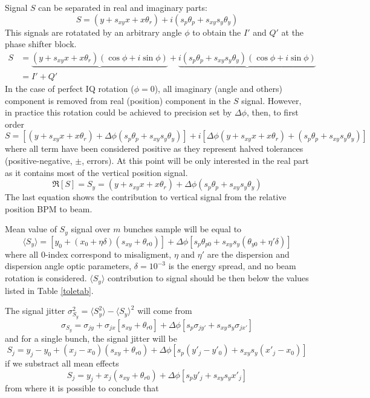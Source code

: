 Signal $S$ can be separated in real and imaginary parts:
\begin{equation}
S = (y+s_{xy}x+x\theta_r)+i(s_p\theta_p+s_{xy}s_y\theta_y)
\end{equation}
This signals are rotatated by an arbitrary angle $\phi$ to obtain the $I'$ and $Q'$ at the phase shifter block.
\begin{align*}
S &= \underbrace{(y+s_{xy}x+x\theta_r)(\cos\phi+i\sin\phi)}+\underbrace{i(s_p\theta_p+s_{xy}s_y\theta_y)(\cos\phi+i\sin\phi)}\\
  &= I' + Q' 
\end{align*}
In the case of perfect IQ rotation ($\phi=0$), all imaginary (angle and others) component is removed from real (position) component in the $S$ signal. However, in practice this rotation could be achieved to precision set by $\Delta\phi$, then, to first order
\begin{equation}
 S = [(y+s_{xy}x+x\theta_r)+\Delta\phi(s_p\theta_p+s_{xy}s_y\theta_y)]+i[\Delta\phi(y+s_{xy}x+x\theta_r)+(s_p\theta_p+s_{xy}s_y\theta_y)]
\end{equation}
where all term have been considered positive as they represent halved tolerances (positive-negative, $\pm$, errors). At this point will be only interested in the real part as it contains most of the vertical position signal.
\begin{equation}
 \Re[S]=S_y = (y+s_{xy}x+x\theta_r)+\Delta\phi(s_p\theta_p+s_{xy}s_y\theta_y)
\end{equation}
The last equation shows the contribution to vertical signal from the relative position BPM to beam.\par
Mean value of $S_y$ signal over $m$ bunches sample will be equal to
\begin{equation}
 \langle S_y\rangle = [y_0+(x_0+\eta\delta)(s_{xy}+\theta_{r0})]+\Delta\phi[s_p\theta_{p0}+s_{xy}s_y(\theta_{y0}+\eta'\delta)]
\end{equation}
where all 0-index correspond to misaligment, $\eta$ and $\eta'$ are the dispersion and dispersion angle optic parameters, $\delta=10^{-3}$ is the energy spread, and no beam rotation is considered. $\langle S_y\rangle$ contribution to signal should be then below the values listed in Table \ref{toletab}.\par
The signal jitter $\sigma_{S_y}^2=\langle S_y^2\rangle-\langle S_y\rangle^2$ will come from
\begin{equation}
 \sigma_{S_y}=\sigma_{jy}+\sigma_{jx}[s_{xy}+\theta_{r0}]+\Delta\phi[s_p\sigma_{jy'}+s_{xy}s_y\sigma_{jx'}]
\end{equation}
and for a single bunch, the signal jitter will be
\begin{equation}
 S_j=y_j-y_0+(x_j-x_0)(s_{xy}+\theta_{r0})+\Delta\phi[s_p(y'_j-y'_0)+s_{xy}s_y(x'_j-x_0)]
\end{equation}
if we substract all mean effects
\begin{equation}
 S_j=y_j+x_j(s_{xy}+\theta_{r0})+\Delta\phi[s_py'_j+s_{xy}s_yx'_j]
\end{equation}
from where it is possible to conclude that 


